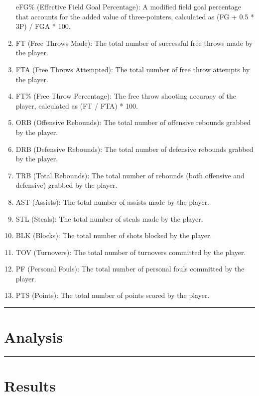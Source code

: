 \documentclass[
]{article}
\begin{document}
\begin{enumerate}
  eFG\% (Effective Field Goal Percentage): A modified field goal
  percentage that accounts for the added value of three-pointers,
  calculated as (FG + 0.5 * 3P) / FGA * 100.
\item
  FT (Free Throws Made): The total number of successful free throws made
  by the player.
\item
  FTA (Free Throws Attempted): The total number of free throw attempts
  by the player.
\item
  FT\% (Free Throw Percentage): The free throw shooting accuracy of the
  player, calculated as (FT / FTA) * 100.
\item
  ORB (Offensive Rebounds): The total number of offensive rebounds
  grabbed by the player.
\item
  DRB (Defensive Rebounds): The total number of defensive rebounds
  grabbed by the player.
\item
  TRB (Total Rebounds): The total number of rebounds (both offensive and
  defensive) grabbed by the player.
\item
  AST (Assists): The total number of assists made by the player.
\item
  STL (Steals): The total number of steals made by the player.
\item
  BLK (Blocks): The total number of shots blocked by the player.
\item
  TOV (Turnovers): The total number of turnovers committed by the
  player.
\item
  PF (Personal Fouls): The total number of personal fouls committed by
  the player.
\item
  PTS (Points): The total number of points scored by the player.
\end{enumerate}

\begin{center}\rule{0.5\linewidth}{0.5pt}\end{center}

\hypertarget{analysis}{%
\section{Analysis}\label{analysis}}

\begin{center}\rule{0.5\linewidth}{0.5pt}\end{center}

\hypertarget{results}{%
\section{Results}\label{results}}
\end{document}
